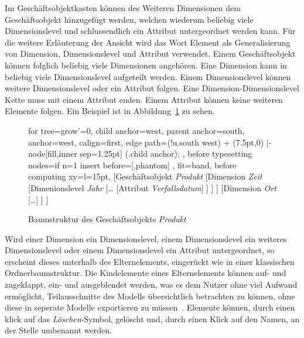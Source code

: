 \documentclass[
  language=german, %
  type=bachelor,%
  ngerman
]{isthesis}
\begin{document}
\begin{content}
  Im Geschäftsobjektkasten können des Weiteren Dimensionen dem Geschäftsobjekt
  hinzugefügt werden, welchen wiederum beliebig viele Dimensionslevel und
  schlussendlich ein Attribut untergeordnet werden kann. Für die weitere
  Erläuterung der Ansicht wird das Wort Element als Generalisierung von
  Dimension, Dimensionslevel und Attribut verwendet.  Einem
  Geschäftsobjekt können folglich beliebig viele Dimensionen angehören. Eine
  Dimension kann in beliebig viele Dimensionslevel aufgeteilt werden. Einem
  Dimensionslevel können weitere Dimensionslevel oder ein Attribut folgen. Eine
  Dimension-Dimensionslevel Kette muss mit einem Attribut enden. Einem Attribut
  können keine weiteren Elemente folgen. Ein Beispiel ist in
  Abbildung~\ref{fig:baumstruktur-produkt} zu sehen.

	\begin{figure}
		\footnotesize

		\begin{forest}
			for tree={grow'=0,
				child anchor=west,
				parent anchor=south,
				anchor=west,
				calign=first,
				edge path={\noexpand{}
					(!u.south west) + (7.5pt,0) |- node[fill,inner sep=1.25pt] {} (.child anchor);
				},
				before typesetting nodes={if n=1
						{insert before={[,phantom]}}
						{}
				},
				fit=band,
				before computing xy={l=15pt},
			}
		[Geschäftsobjekt \textit{Produkt}
			[Dimension \textit{Zeit}
				[Dimenionslevel \textit{Jahr}
					[\ldots{}
						[Attribut \textit{Verfallsdatum}]
					]
				]
			]
			[Dimension \textit{Ort}
				[\ldots{}]
			]
		]
		\end{forest}
    \caption{Baumstruktur des Geschäftsobjekts \textit{Produkt}}\label{fig:baumstruktur-produkt}
	\end{figure}

  Wird einer Dimension ein Dimensionslevel, einem Dimensionslevel ein weiteres
  Dimensionslevel oder einem Dimensionslevel ein Attribut untergeordnet, so
  erscheint dieses unterhalb des Elternelements, eingerückt wie in einer
  klassischen Ordnerbaumstruktur. Die Kindelemente eines Elternelements können
  auf- und zugeklappt, \bzw{} ein- und ausgeblendet werden, was es dem Nutzer
  ohne viel Aufwand ermöglicht, Teilausschnitte des Modells übersichtlich
  betrachten zu können, ohne diese in seperate Modelle exportieren zu
  müssen~\cite[][S. 6 f.]{fleischer2013konstruktion}.  Elemente können, durch einen klick auf
  das \textit{Löschen}-Symbol, gelöscht und, durch einen Klick auf den Namen, an
  der Stelle umbenannt werden.


\end{content}
\end{document}
